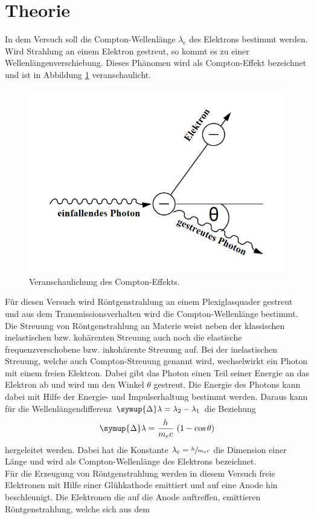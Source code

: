 \section{Theorie}
\label{sec:Theorie}
In dem Versuch soll die Compton-Wellenlänge $\lambda_\text{c}$ des Elektrons bestimmt werden.
Wird Strahlung an einem Elektron gestreut, so kommt es zu einer Wellenlängenverschiebung. Dieses Phänomen wird als Compton-Effekt bezeichnet und ist in Abbildung \ref{fig:com} veranschaulicht.
\begin{figure}
    \centering
    \caption{Veranschaulichung des Compton-Effekts.\cite{v603}}
    \label{fig:com}
    \includegraphics[width = 0.6 \textwidth]{pics/comton.png}
\end{figure}
Für diesen Versuch wird Röntgenstrahlung an einem Plexiglasquader gestreut und aus dem Transmissionsverhalten wird die Compton-Wellenlänge bestimmt.
Die Streuung von Röntgenstrahlung an Materie weist neben der klassischen inelastischen bzw. kohärenten Streuung auch noch die elastische frequenzverschobene bzw. inkohärente Streuung auf.
Bei der inelastischen Streuung, welche auch Compton-Streuung genannt wird, wechselwirkt ein Photon mit einem freien Elektron. Dabei gibt das Photon einen Teil seiner Energie an das Elektron ab und wird um den Winkel $\theta$ gestreut. 
Die Energie des Photons kann dabei mit Hilfe der Energie- und Impulserhaltung bestimmt werden. Daraus kann für die Wellenlängendifferenz $\symup{\Delta}\lambda = \lambda_2 - \lambda_1$ die Beziehung
\begin{equation}
    \symup{\Delta}\lambda= \frac{h}{m_e c} \, \left(1-\cos \theta\right)
    \label{eqn:comton}
\end{equation} 
hergeleitet werden. Dabei hat die Konstante $\lambda_\text{c}= \sfrac{h}{m_e c}$ die Dimension einer Länge und wird als Compton-Wellenlänge des Elektrons bezeichnet.
\\
Für die Erzeugung von Röntgenstrahlung werden in diesem Versuch freie Elektronen mit Hilfe einer Glühkathode emittiert und auf eine Anode hin beschleunigt. Die Elektronen die auf die Anode auftreffen, emittieren Röntgenstrahlung, welche sich aus dem
